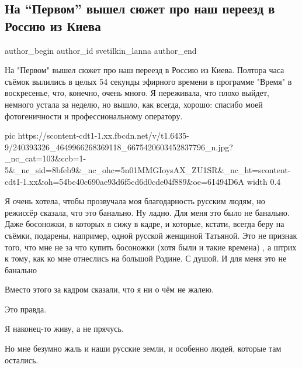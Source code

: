  
 
 
 
 
 
\subsection{На \enquote{Первом} вышел сюжет про наш переезд в Россию из Киева}
\label{sec:23_08_2021.fb.svetilkin_lanna.1.pereezd_rossia_kiev}
 
\ifcmt
 author_begin
   author_id svetilkin_lanna
 author_end
\fi

На "Первом" вышел сюжет про наш переезд в Россию из Киева. Полтора часа съёмок
вылились в целых 54 секунды эфирного времени в программе "Время" в воскресенье,
что, конечно, очень много. Я переживала, что плохо выйдет, немного устала за
неделю, но вышло, как всегда, хорошо: спасибо моей фотогеничности и
профессиональному оператору. 

\ifcmt
  pic https://scontent-cdt1-1.xx.fbcdn.net/v/t1.6435-9/240393326_4649966268369118_6675420603452837796_n.jpg?_nc_cat=103&ccb=1-5&_nc_sid=8bfeb9&_nc_ohc=5n01MMGIoysAX_ZU1SR&_nc_ht=scontent-cdt1-1.xx&oh=54be40c690ae93d6f5cd6d0cde04f889&oe=61494D6A
  width 0.4
\fi

Я очень хотела, чтобы прозвучала моя благодарность русским людям, но режиссёр
сказала, что это банально. Ну ладно. Для меня это было не банально. Даже
босоножки, в которых я сижу в кадре, и которые, кстати, всегда беру на съёмки,
подарены, например, одной русской женщиной Татьяной. Это не признак того, что
мне не за что купить босоножки (хотя были и такие времена) , а штрих к тому,
как ко мне отнеслись на большой Родине. С душой. И для меня это не банально

Вместо этого за кадром сказали, что я ни о чём не жалею.

Это правда. 

Я наконец-то живу, а не прячусь. 

Но мне безумно жаль и наши русские земли, и особенно людей, которые там
остались.

